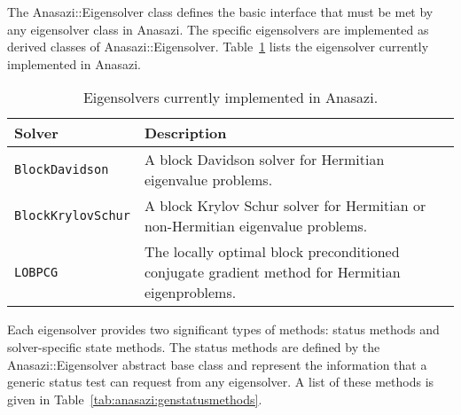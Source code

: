 The Anasazi::Eigensolver class defines the basic interface that must be
met by any eigensolver class in Anasazi. The specific eigensolvers are
implemented as derived classes of Anasazi::Eigensolver.
Table~\ref{tab:anasazi:solvers} lists the eigensolver currently implemented in
Anasazi.

\begin{table}[htp]
\begin{center}
\begin{tabular}{| p{4cm} p{10cm} |}
\hline
Solver & Description \\
\hline
{\tt BlockDavidson}    & A block Davidson solver for Hermitian
                         eigenvalue problems.\\
{\tt BlockKrylovSchur} & A block Krylov Schur solver for Hermitian or
                         non-Hermitian eigenvalue problems.\\
{\tt LOBPCG} & The locally optimal block preconditioned conjugate gradient
method for Hermitian eigenproblems.\\
\hline
\end{tabular}
\caption{Eigensolvers currently implemented in Anasazi.}
\label{tab:anasazi:solvers}
\end{center}
\end{table}

Each eigensolver provides two significant types of methods: status methods and
solver-specific state methods. The status methods are defined by the Anasazi::Eigensolver
abstract base class and represent the information that a generic status test can request
from any eigensolver. A list of these methods is given in
Table~\ref{tab:anasazi:genstatusmethods}.

